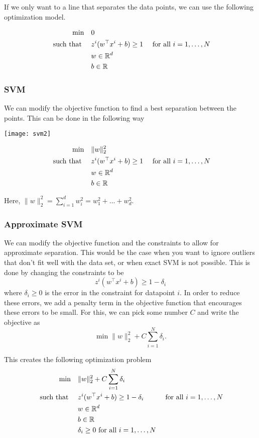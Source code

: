 \documentclass[../open-optimization/open-optimization.tex]{subfiles}
\begin{document}
If we only want to a line that separates the data points, we can use the following optimization model.

\begin{align*}
\min \quad & 0 \\
\text{ such that } \quad & z^i( w^\top x^i + b) \geq 1 & \text{ for all } i=1, \dots, N\\
& w  \in {\mathbb{R}}^d\\
& b \in {\mathbb{R}}
\end{align*}

\subsubsection{SVM}
We can modify the objective function to find a best separation between the points.  This can be done in the following way


\begin{center}
\texttt{[image: svm2]}
\end{center}



\begin{align*}
\min \quad & \|w\|_2^2 \\
\text{ such that } \quad & z^i( w^\top x^i + b) \geq 1 & \text{ for all } i=1, \dots, N\\
& w  \in {\mathbb{R}}^d\\
& b \in {\mathbb{R}}
\end{align*}

Here, $\|w\|_2^2 = \sum_{i=1}^d w_i^2 = w_1^2 + \dots + w_d^2$.


\subsubsection{Approximate SVM}
We can modify the objective function and the constraints to allow for approximate separation.  This would be the case when you want to ignore outliers that don't fit well with the data set, or when exact SVM is not possible.  This is done by changing the constraints to be 
$$
z^i( w^\top x^i + b) \geq 1 - \delta_i
$$
where $\delta_i\geq 0$ is the error in the constraint for datapoint $i$.  In order to reduce these errors, we add a penalty term in the objective function that encourages these errors to be small.  For this, we can pick some number $C$ and write the objective as 
$$
\min  \|w\|_2^2  + C \sum_{i=1}^N \delta_i.
$$

This creates the following optimization problem
\begin{align*}
\min \quad & \|w\|_2^2+ C \sum_{i=1}^N \delta_i \\
\text{ such that } \quad & z^i( w^\top x^i + b) \geq 1  - \delta_i& \text{ for all } i=1, \dots, N\\
& w  \in {\mathbb{R}}^d\\
& b \in {\mathbb{R}}\\
& \delta_i \geq 0  \text { for all } i =1, \dots, N
\end{align*}
\end{document}
